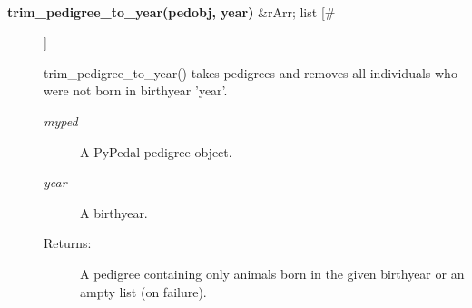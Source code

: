 \documentclass[10pt]{article}
\begin{document}
\begin{description}
\begin{description}
\end{description}
\\ 

\item[\textbf{trim\_pedigree\_to\_year(pedobj, year)}
 \&rArr; list [\#]]

 trim\_pedigree\_to\_year() takes pedigrees and removes all individuals who were not born in birthyear 'year'.
\begin{description}
\item[\emph{myped}
] A PyPedal pedigree object.
\item[\emph{year}
] A birthyear.
\item[Returns:] A pedigree containing only animals born in the given birthyear or an ampty list (on failure).

\end{description}
\\ 


\end{description}
\end{document}
